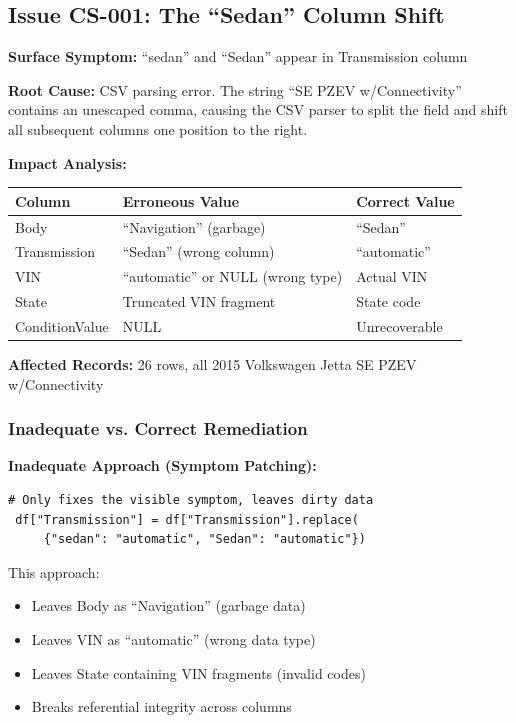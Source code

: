 \documentclass[12pt,a4paper]{article}
\begin{document}
\subsection{Issue CS-001: The ``Sedan'' Column Shift}

\begin{issuebox}
\textbf{Surface Symptom:} ``sedan'' and ``Sedan'' appear in Transmission column

\textbf{Root Cause:} CSV parsing error. The string ``SE PZEV w/Connectivity'' contains an unescaped comma, causing the CSV parser to split the field and shift all subsequent columns one position to the right.

\textbf{Impact Analysis:}
\begin{center}
\begin{tabular}{lll}
\toprule
\textbf{Column} & \textbf{Erroneous Value} & \textbf{Correct Value} \\
\midrule
Body & ``Navigation'' (garbage) & ``Sedan'' \\
Transmission & ``Sedan'' (wrong column) & ``automatic'' \\
VIN & ``automatic'' or NULL (wrong type) & Actual VIN \\
State & Truncated VIN fragment & State code \\
ConditionValue & NULL & Unrecoverable \\
\bottomrule
\end{tabular}
\end{center}

\textbf{Affected Records:} 26 rows, all 2015 Volkswagen Jetta SE PZEV w/Connectivity
\end{issuebox}

\subsubsection{Inadequate vs. Correct Remediation}

\textbf{Inadequate Approach (Symptom Patching):}
\begin{lstlisting}
# Only fixes the visible symptom, leaves dirty data
 df["Transmission"] = df["Transmission"].replace(
     {"sedan": "automatic", "Sedan": "automatic"})
\end{lstlisting}

This approach:
\begin{itemize}
    \item[$\times$] Leaves Body as ``Navigation'' (garbage data)
    \item[$\times$] Leaves VIN as ``automatic'' (wrong data type)
    \item[$\times$] Leaves State containing VIN fragments (invalid codes)
    \item[$\times$] Breaks referential integrity across columns
\end{itemize}
\end{document}
